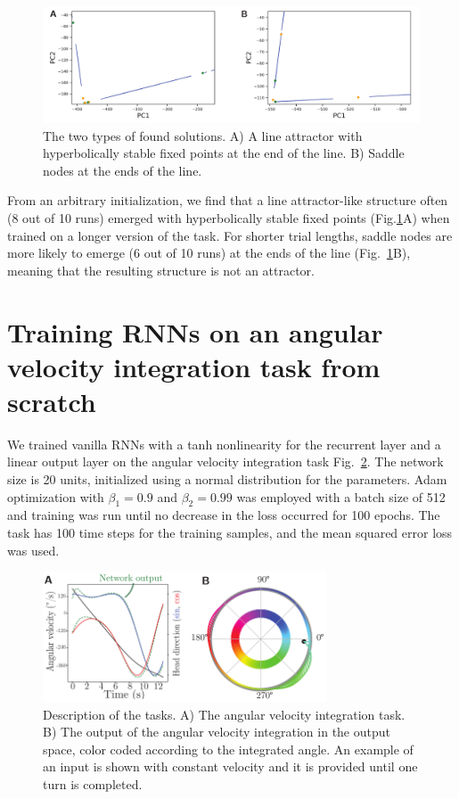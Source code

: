 \documentclass{article} %
\newcounter{ct}
\theoremstyle{definition}
\theoremstyle{remark}
\begin{document}
\begin{figure}[tbhp]
     \centering
    \includegraphics[width=\textwidth]{line_attractor_like_solutions}
       \caption{The two types of found solutions. A) A line attractor with hyperbolically stable fixed points at the end of the line. B) Saddle nodes at the ends of the line.
}
         \label{fig:line_att_sols}
\end{figure}

From an arbitrary initialization, we find that a line attractor-like structure often (8 out of 10 runs) emerged with hyperbolically stable fixed points (Fig.\ref{fig:line_att_sols}A) when trained on a longer version of the task. For shorter trial lengths, saddle nodes are more likely to emerge (6 out of 10 runs) at the ends of the line (Fig.~\ref{fig:line_att_sols}B), meaning that the resulting structure is not an attractor. 




\newpage
\section{Training RNNs on an angular velocity integration task from scratch}

We trained vanilla RNNs with a tanh nonlinearity for the recurrent layer and a linear output layer on the angular velocity integration task Fig.~\ref{fig:angular_task}. The network size is 20 units, initialized using a normal distribution for the parameters. Adam optimization with $\beta_1=0.9$ and $\beta_2=0.99$ was employed with a batch size of 512 and training was run until no decrease in the loss occurred for 100 epochs. The task has 100 time steps for the training samples, and the mean squared error loss was used.

\begin{figure}[tbhp]
     \centering
    \includegraphics[width=0.75\textwidth]{task_fig}
       \caption{Description of the tasks. A) The angular velocity integration task. B) The output of the angular velocity integration in the output space, color coded according to the integrated angle. An example of an input is shown with constant velocity and it is provided until one turn is completed.}
         \label{fig:angular_task}
\end{figure}
\end{document}
